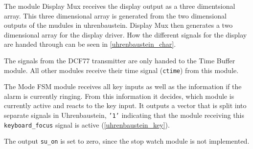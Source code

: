 \documentclass[a4paper]{article}
\begin{document}
The module Display Mux receives the display output as a three dimentsional array.
This three dimensional array is generated from the two dimensional outputs of the mudules in uhrenbaustein.
Display Mux then generates a two dimensional array for the display driver.
How the different signals for the display are handed through can be seen in \ref{uhrenbaustein_char}.

The signals from the DCF77 transmitter are only handed to the Time Buffer module. All other modules receive their time signal (\texttt{ctime}) from this module.

The Mode FSM module receives all key inputs as well as the information if the alarm is currently ringing. 
From this information it decides, which module is currently active and reacts to the key input. 
It outputs a vector that is split into separate signals in Uhrenbaustein, \texttt{'1'} indicating that the module receiving this \texttt{keyboard\_focus} signal is active (\ref{uhrenbaustein_key}).

The output \texttt{su\_on} is set to zero, since the stop watch module is not implemented.
\end{document}
